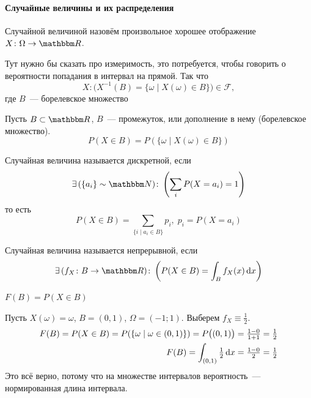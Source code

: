 \documentclass[12pt,timbord]{../../../notes}
\begin{document}
\paragraph{Случайные величины и их распределения}
\label{par:prob::randscal}

\begin{defn}\label{defn:prob::randscal::randscal}
  Случайной величиной назовём произвольное хорошее отображение $X\colon \Omega \to \R$.
  
  \begin{itaux}\label{rem:prob::randscal::meas}
    Тут нужно бы сказать про измеримость, это потребуется, чтобы говорить о вероятности попадания в
    интервал на прямой. Так что \[
      X\colon \bigl(X^{-1} (B) =\{\omega \mid X(\omega)\in B\}\bigr)\in \mathcal F,
    \]
    где $B$~--- борелевское множество
  \end{itaux}

\end{defn}

\begin{defn}\label{defn:prob::randscal::inborel}
  Пусть $B\subset \R$, $B$~--- промежуток, или дополнение в нему (борелевское множество).
  \[
    P(X\in B) = P(\{\omega \mid X(\omega) \in B\})
  \]
\end{defn}

\begin{defn}\label{defn:prob::randscal::disc}
  Случайная величина называется дискретной, если
  \[
    \exists\,(\{a_i\} \sim \N)\colon \left( \sum_{i} P(X = a_i) = 1 \right)
  \]
  то есть 
  \[
    P(X\in B) = \sum_{\{i\mid a_i\in B\}} p_i, \; p_i = P(X = a_i)
  \]
\end{defn}
\begin{defn}\label{defn:prob::randscal::cony}
  Случайная величина называется непрерывной, если
  \[
    \exists\,(f_X\colon B\to \R )\colon \left( P(X\in B) = \int_{B} f_X(x)\, \del x \right)
  \]
\end{defn}
\begin{defn}\label{defn:prob::randscal::distr}
  $F(B) = P(X \in B)$
\end{defn}

\begin{exmp}\label{exmp:prob::randscal::cont}
  Пусть $X(\omega) = \omega$, $B = (0,1)$, $\Omega = (-1;1)$. Выберем  $f_X \equiv \frac{1}{2}$.
  \begin{align*}
    F(B) = P(X\in B) = P(\{\omega \mid \omega \in (0,1)\}) = P\bigl((0,1)\bigr) = \tfrac{1-0}{1+1}
    = \tfrac{1}{2} \\
    F(B) = \int_{(0,1)} \tfrac{1}{2}\, \mathrm{d} x  = \tfrac{1-0}{2} = \tfrac{1}{2}
  \end{align*}
  Это всё верно, потому что на множестве интервалов вероятность~--- нормированная длина интервала.
\end{exmp}
\end{document}
